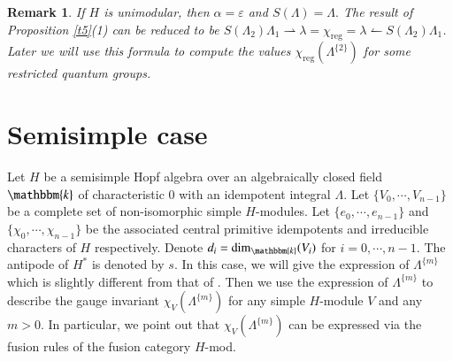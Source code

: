 \documentclass[11pt]{amsart}
\newtheorem{rem}[thm]{Remark}
\numberwithin{equation}{section}
\begin{document}
\begin{rem}\label{rem1}
If $H$ is unimodular, then $\alpha=\varepsilon$ and $S(\Lambda)=\Lambda.$ The result of Proposition \ref{t5}(1) can be reduced to be  $S(\Lambda_2)\Lambda_1\rightharpoonup\lambda=\chi_{\operatorname{reg}}=\lambda\leftharpoonup S(\Lambda_2)\Lambda_1$. Later we will use this formula to compute the values $\chi_{\operatorname{reg}}(\Lambda^{\{2\}})$ for some restricted quantum groups.
\end{rem}

\section{\bf Semisimple case}

Let $H$ be a semisimple Hopf algebra over an algebraically closed field $\mathbbm{k}$ of characteristic 0 with an idempotent integral $\Lambda$. Let $\{V_0,\cdots,V_{n-1}\}$ be a complete set of non-isomorphic simple $H$-modules. Let $\{e_0,\cdots,e_{n-1}\}$ and $\{\chi_0,\cdots,\chi_{n-1}\}$ be the associated central primitive idempotents and irreducible characters of $H$ respectively. Denote $d_i=\dim_{\mathbbm{k}}(V_i)$ for $i=0,\cdots,n-1$. The antipode of $H^*$ is denoted by $s$. In this case,
we will give the expression of $\Lambda^{\{m\}}$ which is slightly different from that of \cite[Proposition 2.2]{CW}. Then we use the expression of $\Lambda^{\{m\}}$ to describe the gauge invariant $\chi_V(\Lambda^{\{m\}})$ for any simple $H$-module $V$ and any $m>0$. In particular, we point out that $\chi_V(\Lambda^{\{m\}})$ can be expressed via the fusion rules of the fusion category $H$-mod.
\end{document}
